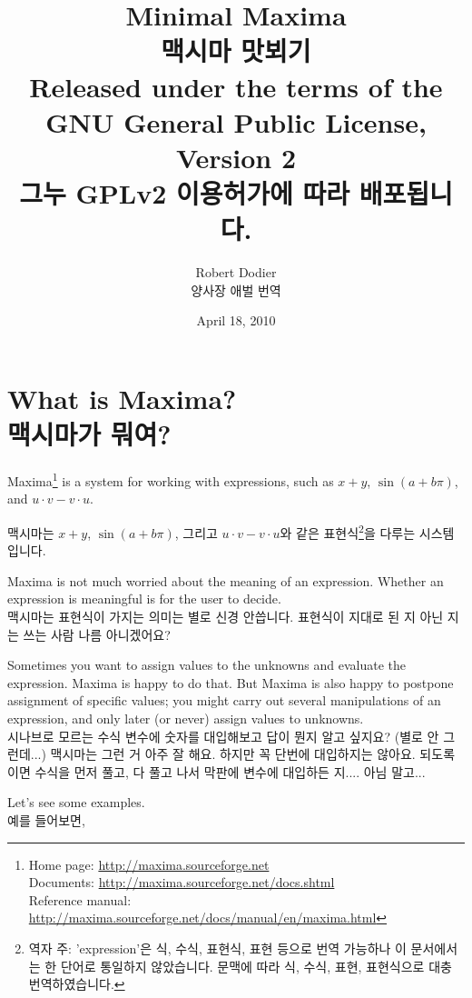 \documentclass[12pt]{article}
\title{Minimal Maxima\\ 맥시마 맛뵈기 \\ 
{\small Released under the terms of the GNU General Public License, Version 2 \\
           그누 GPLv2 이용허가에 따라 배포됩니다.}}
\author{Robert Dodier \\ 양사장 애벌 번역}
\date{April 18, 2010}
\begin{document}
\maketitle

\section{What is Maxima? \\맥시마가 뭐여?}

Maxima\footnote
{Home page: \url{http://maxima.sourceforge.net} \\
Documents: \url{http://maxima.sourceforge.net/docs.shtml} \\
Reference manual: \url{http://maxima.sourceforge.net/docs/manual/en/maxima.html}}
is a system for working with expressions,
such as $x + y$, $\sin (a + b \pi)$, and $u \cdot v - v \cdot u$.

맥시마는 $x + y$, $\sin (a + b \pi)$, 그리고 $u \cdot v - v \cdot u$와 같은 
표현식\footnote{역자 주: 'expression'은 식, 수식, 표현식, 표현 등으로 번역 가능하나 
이 문서에서는 한 단어로 통일하지 않았습니다. 문맥에 따라 식, 수식, 표현, 표현식으로 대충 번역하였습니다.}을 다루는 시스템입니다. 

Maxima is not much worried about the meaning of an expression.
Whether an expression is meaningful is for the user to decide. \\

맥시마는 표현식이 가지는 의미는 별로 신경 안씁니다. 
표현식이 지대로 된 지 아닌 지는 쓰는 사람 나름 아니겠어요?

Sometimes you want to assign values to the unknowns 
and evaluate the expression.
Maxima is happy to do that.
But Maxima is also happy to postpone assignment of specific values;
you might carry out several manipulations of an expression,
and only later (or never) assign values to unknowns. \\

시나브로 모르는 수식 변수에 숫자를 대입해보고 답이 뭔지 알고 싶지요? (별로 안 그런데...)
맥시마는 그런 거 아주 잘 해요. 하지만 꼭 단번에 대입하지는 않아요.
되도록이면 수식을 먼저 풀고, 다 풀고 나서 막판에 변수에 대입하든 지.... 아님 말고...

Let's see some examples. \\
예를 들어보면, 
\end{document}

